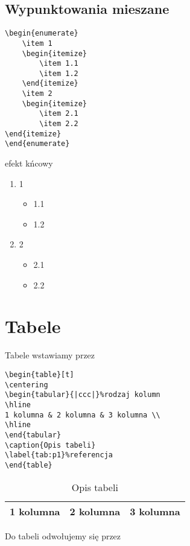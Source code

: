 \subsection{Wypunktowania mieszane}
\begin{verbatim}
\begin{enumerate}
    \item 1
    \begin{itemize}
        \item 1.1
        \item 1.2
    \end{itemize}
    \item 2
    \begin{itemize}
        \item 2.1
        \item 2.2
\end{itemize}
\end{enumerate}
\end{verbatim}
efekt kńcowy
\begin{enumerate}
    \item 1
    \begin{itemize}
        \item 1.1
        \item 1.2
    \end{itemize}
    \item 2
    \begin{itemize}
        \item 2.1
        \item 2.2
\end{itemize}
\end{enumerate}
\section{Tabele}
Tabele wstawiamy przez
\begin{verbatim}
\begin{table}[t]
\centering
\begin{tabular}{|ccc|}%rodzaj kolumn
\hline
1 kolumna & 2 kolumna & 3 kolumna \\
\hline
\end{tabular}
\caption{Opis tabeli}
\label{tab:p1}%referencja
\end{table}
\end{verbatim}
\begin{table}[t]
\centering
\begin{tabular}{|ccc|}%
\hline
1 kolumna & 2 kolumna & 3 kolumna \\
\hline
\end{tabular}
\caption{Opis tabeli}
\label{tab:p1}%
\end{table}
Do tabeli odwołujemy się przez
